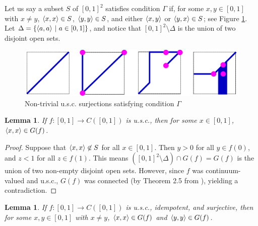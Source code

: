 \documentclass{amsart}
\newtheorem{lemma}[theorem]{Lemma}
\theoremstyle{definition}
\begin{document}
Let us say a subset $S$ of $[0,1]^2$ satisfies condition $\Gamma$ if, for some $x, y \in [0,1]$ with $x \ne y$, $\langle x,x\rangle \in S$, $\langle y,y\rangle \in S$, and either $\langle x,y\rangle$ or $\langle y,x\rangle \in S$; see Figure \ref{conditionGamma}. Let $\Delta = \{\langle a,a\rangle \ | \ a \in [0,1]\}$, and notice that $[0,1]^2 \setminus \Delta$ is the union of two disjoint open sets.

\begin{figure}
\begin{center}
\includegraphics[width=\linewidth]{idempotent_usc_4.pdf}
\end{center}
\caption{Non-trivial u.s.c. surjections satisfying condition $\Gamma$}
\label{conditionGamma}
\end{figure}

\begin{lemma} \label{first lemma}
If $f: [0,1] \rightarrow C([0,1])$ is u.s.c., then for some $x \in [0,1]$, $\langle x,x\rangle \in G(f)$.
\end{lemma}

\begin{proof}
Suppose that $\langle x,x\rangle \not\in S$ for all $x \in [0,1]$. Then $y > 0$ for all $y \in f(0)$, and $z < 1$ for all $z \in f(1)$. This means $([0,1]^2 \setminus \Delta) \cap G(f) = G(f)$ is the union of two non-empty disjoint open sets. However, since $f$ was continuum-valued and u.s.c., $G(f)$ was connected (by Theorem 2.5 from \cite{ingram intro}), yielding a contradiction.
\end{proof}

\begin{lemma}
If $f: [0,1] \rightarrow C([0,1])$ is u.s.c., idempotent, and surjective, then for some $x, y \in [0,1]$ with $x \not= y$, $\langle x,x\rangle \in G(f)$ and $\langle y,y\rangle \in G(f)$.
\end{lemma}
\end{document}
